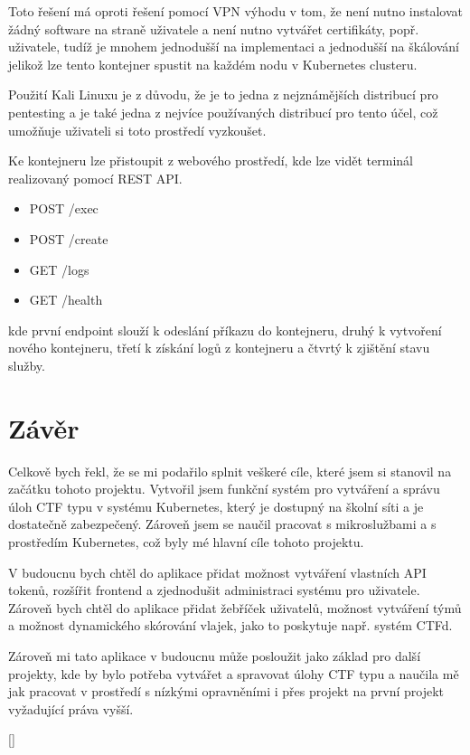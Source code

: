 \documentclass[12pt, a4paper,
oneside,      %
openright
]{report}
\begin{document}
Toto řešení má oproti řešení pomocí VPN výhodu v tom, že není nutno instalovat žádný software na straně uživatele a není nutno vytvářet certifikáty, popř. uživatele, tudíž je mnohem jednodušší na implementaci a jednodušší na škálování jelikož lze tento kontejner spustit na každém nodu v Kubernetes clusteru.

Použití Kali Linuxu je z důvodu, že je to jedna z nejznámějších distribucí pro pentesting a je také jedna z nejvíce používaných distribucí pro tento účel, což umožňuje uživateli si toto prostředí vyzkoušet.

Ke kontejneru lze přistoupit z webového prostředí, kde lze vidět terminál realizovaný pomocí REST API.
\begin{itemize}
	\item POST /exec
	\item POST /create
	\item GET /logs
	\item GET /health
\end{itemize}
kde první endpoint slouží k odeslání příkazu do kontejneru, druhý k vytvoření nového kontejneru, třetí k získání logů z kontejneru a čtvrtý k zjištění stavu služby.


	\chapter{Závěr}

	Celkově bych řekl, že se mi podařilo splnit veškeré cíle, které jsem si stanovil na začátku tohoto projektu. Vytvořil jsem funkční systém pro vytváření a správu úloh CTF typu v systému Kubernetes, který je dostupný na školní síti a je dostatečně zabezpečený. Zároveň jsem se naučil pracovat s mikroslužbami a s prostředím Kubernetes, což byly mé hlavní cíle tohoto projektu.

	V budoucnu bych chtěl do aplikace přidat možnost vytváření vlastních API tokenů, rozšířit frontend a zjednodušit administraci systému pro uživatele. Zároveň bych chtěl do aplikace přidat žebříček uživatelů, možnost vytváření týmů a možnost dynamického skórování vlajek, jako to poskytuje např. systém CTFd.

	Zároveň mi tato aplikace v budoucnu může posloužit jako základ pro další projekty, kde by bylo potřeba vytvářet a spravovat úlohy CTF typu a naučila mě jak pracovat v prostředí s nízkými opravněními i přes projekt na první projekt vyžadující práva vyšší.
	
	
	
	
	\appendix %
	
	[\vspace{-22pt}] %
	
	
	
	
\end{document}
